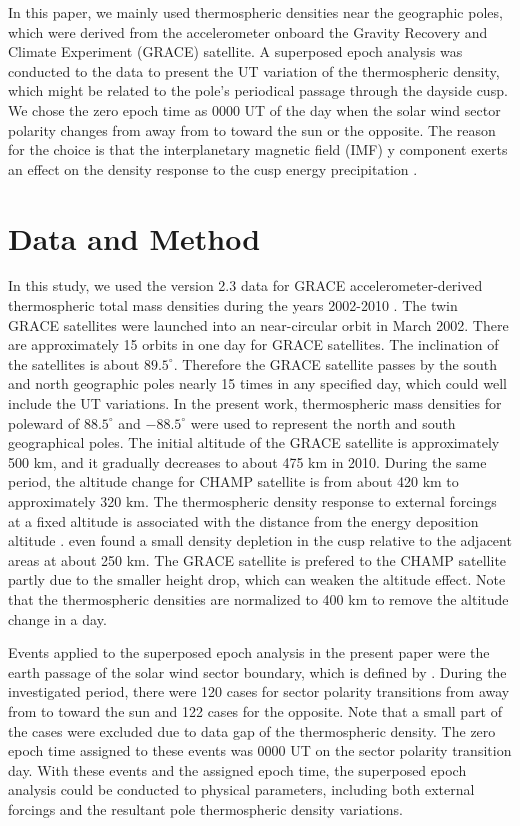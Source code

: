 \documentclass[draft,grl]{/home/gdj/文档/template/agu_template/AGUTeX}
\begin{document}
\begin{article}
    In this paper, we mainly used thermospheric densities near the geographic poles, which were derived from
    the accelerometer onboard the Gravity Recovery and Climate Experiment (GRACE) satellite. 
    A superposed epoch analysis was conducted to the data to present the UT variation of the thermospheric density,
    which might be related to the pole's periodical passage through the dayside cusp. 
    We chose the zero epoch time as 0000 UT of the day when the solar wind sector polarity changes from away from to 
    toward the sun or the opposite.
    The reason for the choice is that the interplanetary magnetic field (IMF) y component exerts an effect on the
    density response to the cusp energy precipitation \citep{Crowley2010, Knipp2011, Li2011}.

\section{Data and Method}
    In this study, we used the version 2.3 data for GRACE accelerometer-derived thermospheric total mass 
    densities during the years 2002-2010 \citep{Sutton2011}. 
    The twin GRACE satellites were launched into an near-circular orbit in March 2002.
    There are approximately 15 orbits in one day for GRACE satellites.
    The inclination of the satellites is about $89.5^\circ$.
    Therefore the GRACE satellite passes by the south and north geographic poles nearly 15 times in any specified day, 
    which could well include the UT variations.
    In the present work, thermospheric mass densities for poleward of $88.5^\circ$ and $-88.5^\circ$ were used to
    represent the north and south geographical poles.
    The initial altitude of the GRACE satellite is approximately 500 km, and it gradually decreases to about 475 km
    in 2010. 
    During the same period, the altitude change for CHAMP satellite is from about 420 km to approximately 320 km.
    The thermospheric density response to external forcings at a fixed altitude is associated with the 
    distance from the energy deposition altitude \citep{Lei2010a}.
    \citet{Clemmons2008} even found a small density depletion in the cusp relative to the adjacent areas at about 250 km.
    The GRACE satellite is prefered to the CHAMP satellite partly due to the smaller height drop, which can weaken the
    altitude effect.
    Note that the thermospheric densities are normalized to 400 km to remove the altitude change in a day.

    Events applied to the superposed epoch analysis in the present paper were the earth passage of the solar 
    wind sector boundary, which is defined by \citet{Svalgaard1976}.
    During the investigated period, there were 120 cases for sector polarity transitions from away from to 
    toward the sun and 122 cases for the opposite.
    Note that a small part of the cases were excluded due to data gap of the thermospheric density.
    The zero epoch time assigned to these events was 0000 UT on the sector polarity transition day.
    With these events and the assigned epoch time, the superposed epoch analysis could be conducted to physical
    parameters, including both external forcings and the resultant pole thermospheric density variations.


\end{article}
\end{document}
